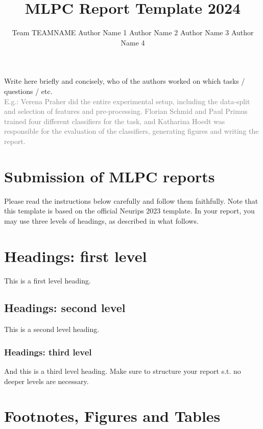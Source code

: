 \documentclass{article}
\title{MLPC Report Template 2024}
\author{%
  Team TEAMNAME \AND
  Author Name 1
  \And
  Author Name 2 
  \And 
  Author Name 3 
  \And 
  Author Name 4
}
\begin{document}
\maketitle


\begin{contributions}
  Write here briefly and concisely, who of the authors worked on which tasks / questions / etc. \\ \textcolor{gray}{E.g.: Verena Praher did the entire experimental setup, including the data-split and selection of features and pre-processing. Florian Schmid and Paul Primus trained four different classifiers for the task, and Katharina Hoedt was responsible for the evaluation of the classifiers, generating figures and writing the report.}
\end{contributions}


\section{Submission of MLPC reports}

Please read the instructions below carefully and follow them faithfully. Note that this template is based on the official Neurips 2023 template. In your report, you may use three levels of headings, as described in what follows. 

\section{Headings: first level}
\label{sec:headings}

This is a first level heading. 

\subsection{Headings: second level}

This is a second level heading. 


\subsubsection{Headings: third level}

And this is a third level heading. Make sure to structure your report s.t. no deeper levels are necessary. 

\section{Footnotes, Figures and Tables}
\end{document}
